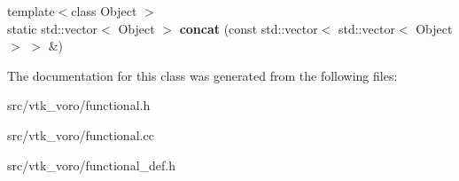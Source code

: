 \begin{DoxyCompactItemize}
\item 
{\footnotesize template$<$class Object $>$ }\\static std\+::vector$<$ Object $>$ {\bfseries concat} (const std\+::vector$<$ std\+::vector$<$ Object $>$ $>$ \&)\hypertarget{classtools_1_1Vectors_aade10624942ab4a0d748dd16e0ac8a7f}{}\label{classtools_1_1Vectors_aade10624942ab4a0d748dd16e0ac8a7f}

\end{DoxyCompactItemize}


The documentation for this class was generated from the following files\+:\begin{DoxyCompactItemize}
\item 
src/vtk\+\_\+voro/functional.\+h\item 
src/vtk\+\_\+voro/functional.\+cc\item 
src/vtk\+\_\+voro/functional\+\_\+def.\+h\end{DoxyCompactItemize}
